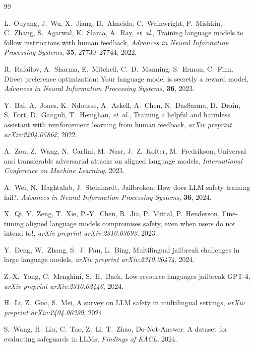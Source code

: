 \documentclass[AMS,STIX2COL]{WileyNJD-v2}
\begin{document}
\begin{thebibliography}{99}

L.~Ouyang, J.~Wu, X.~Jiang, D.~Almeida, C.~Wainwright, P.~Mishkin, C.~Zhang,
S.~Agarwal, K.~Slama, A.~Ray, \textit{et~al.},
Training language models to follow instructions with human feedback,
\textit{Advances in Neural Information Processing Systems},
\textbf{35}, 27730--27744, 2022.

R.~Rafailov, A.~Sharma, E.~Mitchell, C.~D.~Manning, S.~Ermon, C.~Finn,
Direct preference optimization: Your language model is secretly a reward model,
\textit{Advances in Neural Information Processing Systems},
\textbf{36}, 2023.

Y.~Bai, A.~Jones, K.~Ndousse, A.~Askell, A.~Chen, N.~DasSarma, D.~Drain,
S.~Fort, D.~Ganguli, T.~Henighan, \textit{et~al.},
Training a helpful and harmless assistant with reinforcement learning from
human feedback,
\textit{arXiv preprint arXiv:2204.05862}, 2022.

A.~Zou, Z.~Wang, N.~Carlini, M.~Nasr, J.~Z.~Kolter, M.~Fredrikson,
Universal and transferable adversarial attacks on aligned language models,
\textit{International Conference on Machine Learning}, 2023.

A.~Wei, N.~Haghtalab, J.~Steinhardt,
Jailbroken: How does LLM safety training fail?,
\textit{Advances in Neural Information Processing Systems},
\textbf{36}, 2024.

X.~Qi, Y.~Zeng, T.~Xie, P.-Y.~Chen, R.~Jia, P.~Mittal, P.~Henderson,
Fine-tuning aligned language models compromises safety, even when users
do not intend to!,
\textit{arXiv preprint arXiv:2310.03693}, 2023.

Y.~Deng, W.~Zhang, S.~J.~Pan, L.~Bing,
Multilingual jailbreak challenges in large language models,
\textit{arXiv preprint arXiv:2310.06474}, 2024.

Z.-X.~Yong, C.~Menghini, S.~H.~Bach,
Low-resource languages jailbreak GPT-4,
\textit{arXiv preprint arXiv:2310.02446}, 2024.

H.~Li, Z.~Guo, S.~Mei,
A survey on LLM safety in multilingual settings,
\textit{arXiv preprint arXiv:2404.00399}, 2024.

S.~Wang, H.~Liu, C.~Tao, Z.~Li, T.~Zhao,
Do-Not-Answer: A dataset for evaluating safeguards in LLMs,
\textit{Findings of EACL}, 2024.


\end{thebibliography}
\end{document}
